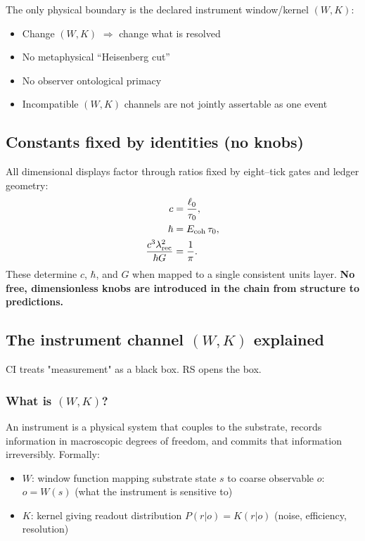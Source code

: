 \documentclass[11pt]{article}
\begin{document}
The only physical boundary is the declared instrument window/kernel $(W,K)$:
\begin{itemize}[nosep]
  \item Change $(W,K)$ $\Rightarrow$ change what is resolved
  \item No metaphysical ``Heisenberg cut''
  \item No observer ontological primacy
  \item Incompatible $(W,K)$ channels are not jointly assertable as one event
\end{itemize}

\subsection{Constants fixed by identities (no knobs)}

All dimensional displays factor through ratios fixed by eight--tick gates and ledger geometry:
\begin{align}
  c &= \frac{\ell_0}{\tau_0}, \label{eq:c}\\
  \hbar &= E_{\rm coh}\,\tau_0, \label{eq:hbar}\\
  \frac{c^3\lambda_{\rm rec}^2}{\hbar G} &= \frac{1}{\pi}. \label{eq:lambda_rec}
\end{align}
These determine $c$, $\hbar$, and $G$ when mapped to a single consistent units layer. \textbf{No free, dimensionless knobs are introduced in the chain from structure to predictions.}

\subsection{The instrument channel $(W,K)$ explained}

CI treats "measurement" as a black box. RS opens the box.

\subsubsection*{What is $(W,K)$?}
An instrument is a physical system that couples to the substrate, records information in macroscopic degrees of freedom, and commits that information irreversibly. Formally:
\begin{itemize}[nosep]
  \item $W$: window function mapping substrate state $s$ to coarse observable $o$: $o\!=\!W(s)$ (what the instrument is sensitive to)
  \item $K$: kernel giving readout distribution $P(r|o)\!=\!K(r|o)$ (noise, efficiency, resolution)
\end{itemize}
\end{document}

